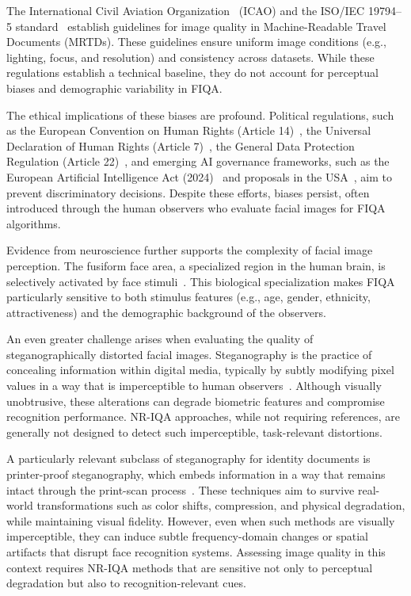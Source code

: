 The International Civil Aviation Organization~\cite{icao_2015} (ICAO) and the ISO/IEC 19794--5 standard~\cite{iso_iec29794-5_2010} establish guidelines for image quality in Machine-Readable Travel Documents (MRTDs). These guidelines ensure uniform image conditions (e.g., lighting, focus, and resolution) and consistency across datasets. While these regulations establish a technical baseline, they do not account for perceptual biases and demographic variability in FIQA.\@

The ethical implications of these biases are profound. Political regulations, such as the European Convention on Human Rights (Article 14)~\cite{echr_article14}, the Universal Declaration of Human Rights (Article 7)~\cite{udhr_article7}, the General Data Protection Regulation (Article 22)~\cite{gdpr_article22}, and emerging AI governance frameworks, such as the European Artificial Intelligence Act (2024)~\cite{eu_ai_act_2024} and proposals in the USA~\cite{us_ai_bill_rights_2022}, aim to prevent discriminatory decisions. Despite these efforts, biases persist, often introduced through the human observers who evaluate facial images for FIQA algorithms.

Evidence from neuroscience further supports the complexity of facial image perception. The fusiform face area, a specialized region in the human brain, is selectively activated by face stimuli~\cite{kanwisher2006fusiform, tsao2008mechanisms}. This biological specialization makes FIQA particularly sensitive to both stimulus features (e.g., age, gender, ethnicity, attractiveness) and the demographic background of the observers.

An even greater challenge arises when evaluating the quality of steganographically distorted facial images. Steganography is the practice of concealing information within digital media, typically by subtly modifying pixel values in a way that is imperceptible to human observers~\cite{steganography}. Although visually unobtrusive, these alterations can degrade biometric features and compromise recognition performance. NR-IQA approaches, while not requiring references, are generally not designed to detect such imperceptible, task-relevant distortions.

A particularly relevant subclass of steganography for identity documents is printer-proof steganography, which embeds information in a way that remains intact through the print-scan process~\cite{codeface2021, stegastamp2020}. These techniques aim to survive real-world transformations such as color shifts, compression, and physical degradation, while maintaining visual fidelity. However, even when such methods are visually imperceptible, they can induce subtle frequency-domain changes or spatial artifacts that disrupt face recognition systems. Assessing image quality in this context requires NR-IQA methods that are sensitive not only to perceptual degradation but also to recognition-relevant cues.


